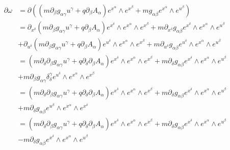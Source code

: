 \documentclass[11pt]{article}
\begin{document}
\begin{equation}
\begin{aligned}
\partial \omega &= \partial \left(\left(m \partial_\beta g_{\alpha \gamma}u^\gamma + q \partial_\beta A_\alpha\right)e^{x^\alpha}\wedge e^{x^\beta} + mg_{\alpha\beta} e^{x^\alpha}\wedge e^{u^\beta}\right) \\ 
&= \partial_{x^\delta} \left(m \partial_\beta g_{\alpha \gamma}u^\gamma + q \partial_\beta A_\alpha\right)e^{x^\delta}\wedge e^{x^\alpha}\wedge e^{x^\beta} + m \partial_{x^\delta}  g_{\alpha\beta} e^{x^\delta}\wedge e^{x^\alpha}\wedge e^{u^\beta} \\
&+ \partial_{u^\delta} \left(m \partial_\beta g_{\alpha \gamma}u^\gamma + q \partial_\beta A_\alpha\right)e^{u^\delta}\wedge e^{x^\alpha}\wedge e^{x^\beta} + m \partial_{u^\delta} g_{\alpha\beta} e^{u^\delta}\wedge  e^{x^\alpha}\wedge e^{u^\beta} \\
&= \left(m \partial_\delta \partial_\beta g_{\alpha \gamma}u^\gamma + q \partial_\delta \partial_\beta A_\alpha\right)e^{x^\delta}\wedge e^{x^\alpha}\wedge e^{x^\beta} + m \partial_\delta  g_{\alpha\beta} e^{x^\delta}\wedge e^{x^\alpha}\wedge e^{u^\beta} \\
&+ m \partial_\beta g_{\alpha \gamma}\delta^\gamma_\delta e^{u^\delta}\wedge e^{x^\alpha}\wedge e^{x^\beta}  \\
&= \left(m \partial_\delta \partial_\beta g_{\alpha \gamma}u^\gamma + q \partial_\delta \partial_\beta A_\alpha\right)e^{x^\delta}\wedge e^{x^\alpha}\wedge e^{x^\beta} + m \partial_\delta  g_{\alpha\beta} e^{x^\delta}\wedge e^{x^\alpha}\wedge e^{u^\beta} \\
&+ m \partial_\delta g_{\alpha \beta} e^{u^\beta}\wedge e^{x^\alpha}\wedge e^{x^\delta}  \\
&= \left(m \partial_\delta \partial_\beta g_{\alpha \gamma}u^\gamma + q \partial_\delta \partial_\beta A_\alpha\right)e^{x^\delta}\wedge e^{x^\alpha}\wedge e^{x^\beta} + m \partial_\delta  g_{\alpha\beta} e^{x^\delta}\wedge e^{x^\alpha}\wedge e^{u^\beta} \\
&- m \partial_\delta g_{\alpha \beta} e^{x^\delta}\wedge e^{x^\alpha}\wedge e^{u^\beta} \\
\end{aligned}
\end{equation}
\end{document}
